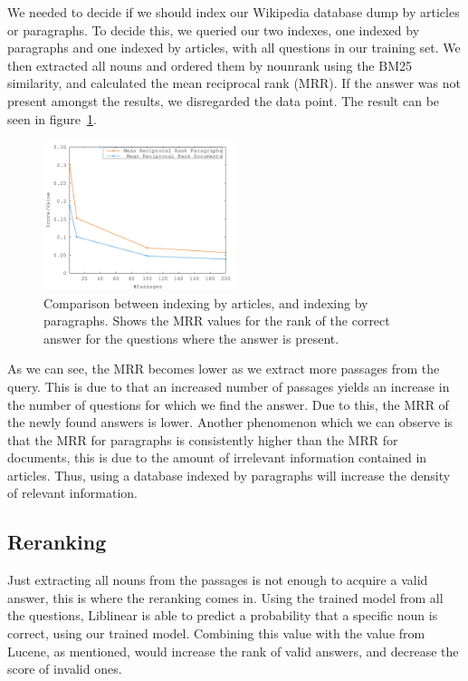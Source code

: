 We needed to decide if we should index our Wikipedia database dump by articles or paragraphs.
To decide this, we queried our two indexes, one indexed by paragraphs and
one indexed by articles, with all questions in our training set. We then extracted 
all nouns and ordered them by nounrank using the BM25 similarity, and calculated the mean reciprocal rank (MRR). \cite{mrr}
If the answer was not present amongst the results, we disregarded the data point.
The result can be seen in figure~\ref{fig:median}.

\begin{figure}[h!]
  \centering
  \includegraphics[width=0.5\textwidth]{figures/median.pdf}
  \caption{Comparison between indexing by articles, and indexing by paragraphs. 
  Shows the MRR values for the rank of the correct answer for the questions where 
  the answer is present.}
  \label{fig:median}
\end{figure}

As we can see, the MRR becomes lower as we extract more passages from the query. 
This is due to that an increased number of passages yields an increase in the number of questions for which we find
the answer. Due to this, the MRR of the newly found answers is lower.
Another phenomenon which we can observe is that the MRR for 
paragraphs is consistently higher than the MRR for documents, this is due to the amount of irrelevant
information contained in articles. Thus, using a database indexed by paragraphs will increase 
the density of relevant information. 

\subsection{Reranking}
Just extracting all nouns from the passages is not enough to acquire a valid answer, this is where the reranking comes in.
Using the trained model from all the questions, Liblinear is able to predict a probability that a specific noun is correct, using
our trained model.
Combining this value with the value from Lucene, as mentioned, would increase the rank of valid answers, and decrease the score of invalid ones.

